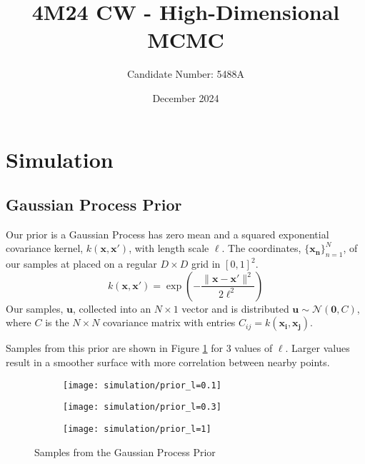 \documentclass[11pt]{article}
\title{4M24 CW - High-Dimensional MCMC}
\author{Candidate Number: 5488A}
\date{December 2024}
\begin{document}
\maketitle

\section{Simulation}
\subsection{Gaussian Process Prior}
Our prior is a Gaussian Process has zero mean and a squared exponential covariance kernel, $k(\boldsymbol{x}, \boldsymbol{x}')$, with length scale $\ell$. The coordinates, $\{\boldsymbol{x_n}\}_{n=1}^{N}$, of our samples at placed on a regular $D \times D$ grid in $[0, 1]^2$. 
\begin{equation}
    k(\boldsymbol{x}, \boldsymbol{x}') = \exp\left(-\frac{\|\boldsymbol{x} - \boldsymbol{x}'\|^2}{2\ell^2}\right)
\end{equation}
Our samples, $\boldsymbol{u}$, collected into an $N \times 1$ vector and is distributed $\boldsymbol{u} \sim \mathcal{N}(\boldsymbol{0}, C)$, where $C$ is the $N \times N$ covariance matrix with entries $C_{ij} = k(\boldsymbol{x_i}, \boldsymbol{x_j})$.

Samples from this prior are shown in Figure \ref{fig:gp_prior} for 3 values of $\ell$. Larger values result in a smoother surface with more correlation between nearby points.

\begin{figure}
    \centering
    \begin{subfigure}{0.3\textwidth}
        \texttt{[image: simulation/prior\_l=0.1]}
    \end{subfigure}
    \begin{subfigure}{0.3\textwidth}
        \texttt{[image: simulation/prior\_l=0.3]}
    \end{subfigure}
    \begin{subfigure}{0.3\textwidth}
        \texttt{[image: simulation/prior\_l=1]}
    \end{subfigure}
    \caption{Samples from the Gaussian Process Prior}
    \label{fig:gp_prior}
\end{figure}
\end{document}
